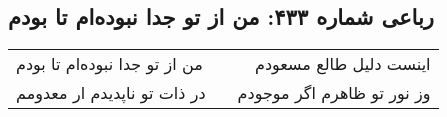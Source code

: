 \begin{center}
\section*{رباعی شماره ۴۳۳: من از تو جدا نبوده‌ام تا بودم}
\label{sec:sh433}
\begin{longtable}{l p{0.5cm} r}
من از تو جدا نبوده‌ام تا بودم
&&
اینست دلیل طالع مسعودم
\\
در ذات تو ناپدیدم ار معدومم
&&
وز نور تو ظاهرم اگر موجودم
\\
\end{longtable}
\end{center}
